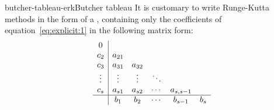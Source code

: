 \begin{Definition*}{butcher-tableau-erk}{Butcher tableau}
  It is customary to write Runge-Kutta methods in the form of a
  , containing only the coefficients of
  equation~\eqref{eq:explicit:1} in the following matrix form:
\begin{gather}
  \label{eq:explicit:2}
  \begin{array}{c|ccccc}
    0 & \\
    c_2 & a_{21} \\
    c_3 & a_{31} & a_{32} \\
    \vdots & \vdots & \vdots & \ddots \\
    c_s & a_{s1} & a_{s2} & \cdots & a_{s,s-1} \\
    \hline
    & b_1 & b_2 & \cdots & b_{s-1} & b_s \\
  \end{array}
\end{gather}
\end{Definition*}

